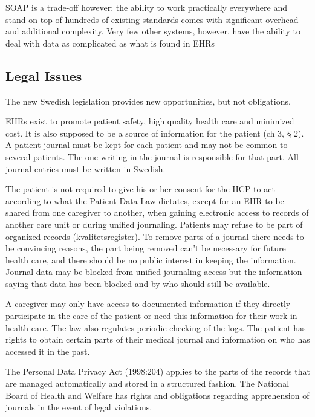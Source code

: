 \documentclass[14pt]{article}
\begin{document}
\gls{SOAP} is a trade-off however: the ability to work practically everywhere and stand on top of hundreds of existing standards comes with significant overhead and additional complexity. Very few other systems, however, have the ability to deal with data as complicated as what is found in \glspl{EHR}

\subsection{Legal Issues}

The new Swedish legislation provides new opportunities, but not obligations. \cite{RiR19}

\glspl{EHR} exist to promote patient safety, high quality health care and minimized cost. It is also supposed to be a source of information for the patient (ch 3, § 2). A patient journal must be kept for each patient and may not be common to several patients. The one writing in the journal is responsible for that part. All journal entries must be written in Swedish. \cite{PatientDataAct}

The patient is not required to give his or her consent for the \gls{HCP} to act according to what the Patient Data Law dictates, except for an \gls{EHR} to be shared from one caregiver to another, when gaining electronic access to records of another care unit or during unified journaling. Patients may refuse to be part of organized records (kvalitetsregister). To remove parts of a journal there needs to be convincing reasons, the part being removed can't be necessary for future health care, and there should be no public interest in keeping the information. Journal data may be blocked from unified journaling access but the information saying that data has been blocked and by who should still be available. 

A caregiver may only have access to documented information if they directly participate in the care of the patient or need this information for their work in health care. The law also regulates periodic checking of the logs. The patient has rights to obtain certain parts of their medical journal and information on who has accessed it in the past.\cite{PatientDataAct}

The Personal Data Privacy Act (1998:204) applies to the parts of the records that are managed automatically and stored in a structured fashion. The National Board of Health and Welfare has rights and obligations regarding apprehension of journals in the event of legal violations.\cite{PatientDataAct}
\end{document}
